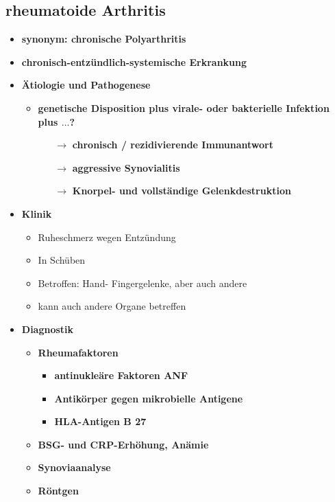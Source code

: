 \subsection{rheumatoide Arthritis}
	\begin{itemize}
		\item \textbf{synonym: chronische Polyarthritis}
		\item \textbf{chronisch-entzündlich-systemische Erkrankung}
		\item \textbf{Ätiologie und Pathogenese}
			\begin{itemize}
				\item \textbf{genetische Disposition plus virale- oder bakterielle Infektion plus $\dots$?}
					\begin{itemize}
						\item[$\rightarrow$] \textbf{chronisch / rezidivierende Immunantwort}
						\item[$\rightarrow$] \textbf{aggressive Synovialitis}
						\item[$\rightarrow$] \textbf{Knorpel- und vollständige Gelenkdestruktion}
					\end{itemize}
			\end{itemize}
		\item \textbf{Klinik}
			\begin{itemize}
				\item Ruheschmerz wegen Entzündung
				\item In Schüben
				\item Betroffen: Hand- Fingergelenke, aber auch andere
				\item kann auch andere Organe betreffen
			\end{itemize}
	\pagebreak
		\item \textbf{Diagnostik}
			\begin{itemize}
				\item \textbf{Rheumafaktoren}
					\begin{itemize}
						\item \textbf{antinukleäre Faktoren ANF}
						\item \textbf{Antikörper gegen mikrobielle Antigene}
						\item \textbf{HLA-Antigen B 27}
					\end{itemize}
				\item \textbf{BSG- und CRP-Erhöhung, Anämie}
				\item \textbf{Synoviaanalyse}
				\item \textbf{Röntgen}
			\end{itemize}

\end{itemize}
